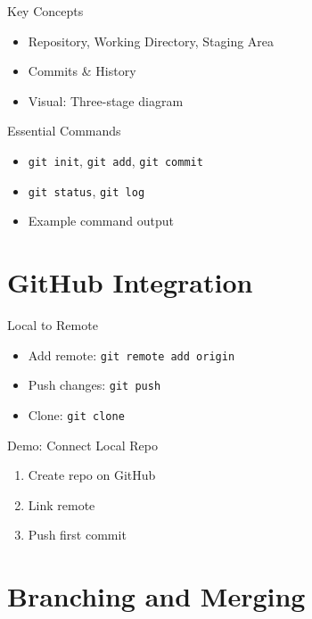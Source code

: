 \documentclass[aspectratio=169]{beamer} %
\begin{document}
\begin{frame}{Key Concepts}
  \begin{itemize}
    \item Repository, Working Directory, Staging Area
    \item Commits \& History
    \item Visual: Three-stage diagram
  \end{itemize}
\end{frame}

\begin{frame}{Essential Commands}
  \begin{itemize}
    \item \texttt{git init}, \texttt{git add}, \texttt{git commit}
    \item \texttt{git status}, \texttt{git log}
    \item Example command output
  \end{itemize}
\end{frame}

\section{GitHub Integration}

\begin{frame}{Local to Remote}
  \begin{itemize}
    \item Add remote: \texttt{git remote add origin}
    \item Push changes: \texttt{git push}
    \item Clone: \texttt{git clone}
  \end{itemize}
\end{frame}

\begin{frame}{Demo: Connect Local Repo}
  \begin{enumerate}
    \item Create repo on GitHub
    \item Link remote
    \item Push first commit
  \end{enumerate}
\end{frame}

\section{Branching and Merging}
\end{document}
